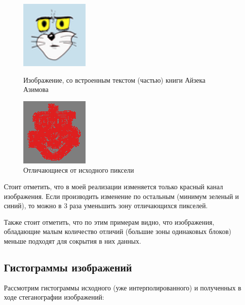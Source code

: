 \documentclass[a4paper]{article}
\begin{document}
  \begin{figure}[H]
    \centering
    \begin{minipage}[t]{0.4\textwidth}
        \centering
        \includegraphics{stego_3}
        \caption{Изображение, со встроенным текстом (частью) книги Айзека Азимова}
    \end{minipage}
    \hfill
    \begin{minipage}[t]{0.4\textwidth}
        \centering
        \includegraphics{diff_3}
        \caption{Отличающиеся от исходного пиксели} 
    \end{minipage}
  \end{figure}

  Стоит отметить, что в моей реализации изменяется только красный канал изображения.
  Если производить изменение по остальным (минимум зеленый и синий), то можно
  в 3 раза уменьшить зону отличающихся пикселей.

  Также стоит отметить, что по этим примерам видно, что изображения,
  обладающие малым количество отличий (большие зоны одинаковых блоков)
  меньше подходят для сокрытия в них данных.

  \subsection{Гистограммы изображений}

  Рассмотрим гистограммы исходного (уже интерполированного) и полученных
  в ходе стеганографии изображений:
\end{document}
